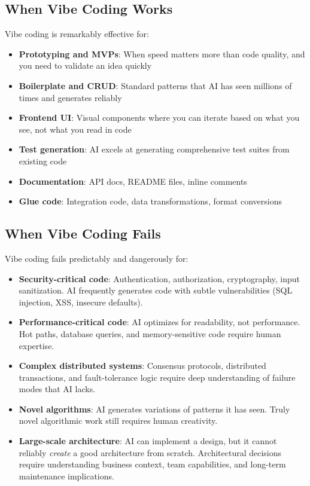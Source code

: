 \subsection{When Vibe Coding Works}

Vibe coding is remarkably effective for:

\begin{itemize}[leftmargin=*]
    \item \textbf{Prototyping and MVPs}: When speed matters more than code quality, and you need to validate an idea quickly
    \item \textbf{Boilerplate and CRUD}: Standard patterns that AI has seen millions of times and generates reliably
    \item \textbf{Frontend UI}: Visual components where you can iterate based on what you see, not what you read in code
    \item \textbf{Test generation}: AI excels at generating comprehensive test suites from existing code
    \item \textbf{Documentation}: API docs, README files, inline comments
    \item \textbf{Glue code}: Integration code, data transformations, format conversions
\end{itemize}

\subsection{When Vibe Coding Fails}

Vibe coding fails predictably and dangerously for:

\begin{itemize}[leftmargin=*]
    \item \textbf{Security-critical code}: Authentication, authorization, cryptography, input sanitization. AI frequently generates code with subtle vulnerabilities (SQL injection, XSS, insecure defaults).
    \item \textbf{Performance-critical code}: AI optimizes for readability, not performance. Hot paths, database queries, and memory-sensitive code require human expertise.
    \item \textbf{Complex distributed systems}: Consensus protocols, distributed transactions, and fault-tolerance logic require deep understanding of failure modes that AI lacks.
    \item \textbf{Novel algorithms}: AI generates variations of patterns it has seen. Truly novel algorithmic work still requires human creativity.
    \item \textbf{Large-scale architecture}: AI can implement a design, but it cannot reliably \emph{create} a good architecture from scratch. Architectural decisions require understanding business context, team capabilities, and long-term maintenance implications.
\end{itemize}

